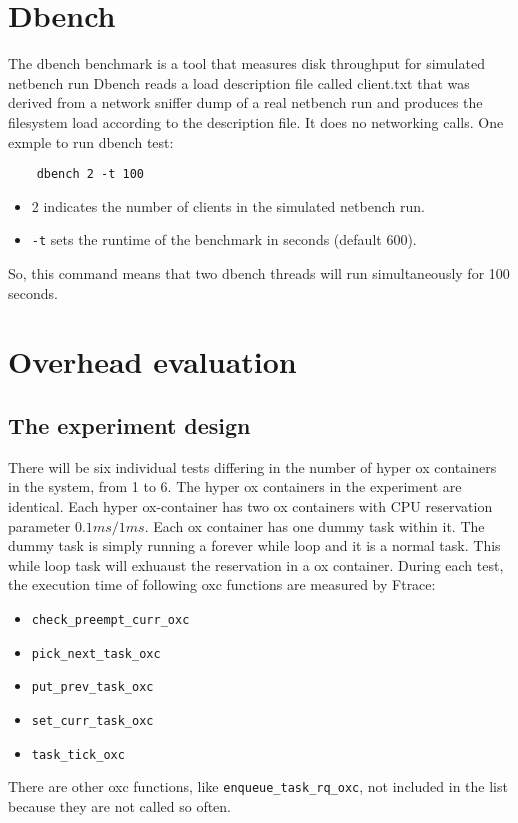 \section{Dbench}
The dbench benchmark is a tool that measures disk throughput for simulated
netbench run Dbench reads a load description file called client.txt that was
derived from a network sniffer dump of a real netbench run and produces the
filesystem load according to the description file. It does no networking calls.
One exmple to run dbench test:
\begin{lstlisting}
	dbench 2 -t 100
\end{lstlisting}
\begin{itemize}
\item 2 indicates the number of clients in the simulated netbench run.
\item \texttt{-t} sets the runtime of the benchmark in seconds (default 600).
\end{itemize}
So, this command means that two dbench threads will run simultaneously for 
100 seconds.

\section{Overhead evaluation}
\subsection{The experiment design}
There will be six individual tests differing in the number of
hyper ox containers in the system, from 1 to 6.
The hyper ox containers in the experiment are identical.
Each hyper ox-container has two ox containers with CPU reservation parameter
$0.1ms/1ms$. Each ox container has one dummy task within it. The dummy task
is simply running a forever while loop and it is a normal task. This while loop
task will exhuaust the reservation in a ox container. During each 
test, the execution time of following oxc functions are measured by Ftrace:
\begin{itemize} 
\item \texttt{check\_preempt\_curr\_oxc}
\item \texttt{pick\_next\_task\_oxc}
\item \texttt{put\_prev\_task\_oxc}
\item \texttt{set\_curr\_task\_oxc}
\item \texttt{task\_tick\_oxc}
\end{itemize} 
There are other oxc functions, like \texttt{enqueue\_task\_rq\_oxc}, not
included in the list because they are not called so often.

